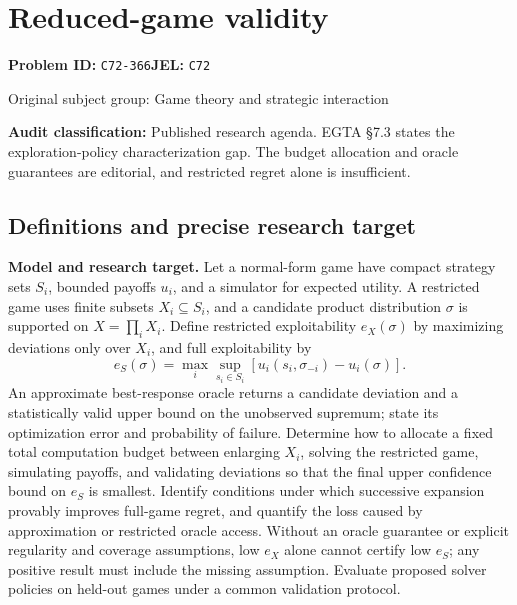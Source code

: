\documentclass[11pt,a4paper]{article}
\begin{document}
\section*{Reduced-game validity}
\textbf{Problem ID:} \texttt{C72-366}\quad \textbf{JEL:} \texttt{C72}\par
\label{problem:OP-0289}
{\sffamily\small\color{muted}Original subject group: Game theory and strategic interaction\par}
\label{definitions:problem:30007571}
\textbf{Audit classification:} Published research agenda. EGTA §7.3 states the exploration-policy characterization gap. The budget allocation and oracle guarantees are editorial, and restricted regret alone is insufficient.
\subsection*{Definitions and precise research target}
\textbf{Model and research target.} Let a normal-form game have compact strategy sets \(S_i\), bounded payoffs \(u_i\), and a simulator for expected utility. A restricted game uses finite subsets \(X_i\subseteq S_i\), and a candidate product distribution \(\sigma\) is supported on \(X=\prod_iX_i\). Define restricted exploitability \(e_X(\sigma)\) by maximizing deviations only over \(X_i\), and full exploitability by
\[
 e_S(\sigma)=\max_i\sup_{s_i\in S_i}
 [u_i(s_i,\sigma_{-i})-u_i(\sigma)].
\]
An approximate best-response oracle returns a candidate deviation and a statistically valid upper bound on the unobserved supremum; state its optimization error and probability of failure. Determine how to allocate a fixed total computation budget between enlarging \(X_i\), solving the restricted game, simulating payoffs, and validating deviations so that the final upper confidence bound on \(e_S\) is smallest. Identify conditions under which successive expansion provably improves full-game regret, and quantify the loss caused by approximation or restricted oracle access. Without an oracle guarantee or explicit regularity and coverage assumptions, low \(e_X\) alone cannot certify low \(e_S\); any positive result must include the missing assumption. Evaluate proposed solver policies on held-out games under a common validation protocol.
\end{document}
